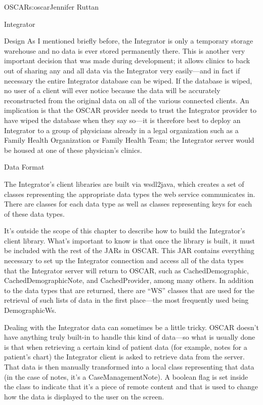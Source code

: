 \begin{aosachapter}{OSCAR}{s:oscar}{Jennifer Ruttan}
\begin{aosasect1}{Integrator}
\begin{aosasect2}{Design}
As I mentioned briefly before, the Integrator is only a temporary
storage warehouse and no data is ever stored permanently there. This
is another very important decision that was made during development;
it allows clinics to back out of sharing any and all data via the
Integrator very easily---and in fact if necessary the entire
Integrator database can be wiped. If the database is wiped, no user of
a client will ever notice because the data will be accurately
reconstructed from the original data on all of the various connected
clients. An implication is that the OSCAR provider needs to trust the
Integrator provider to have wiped the database when they say so---it
is therefore best to deploy an Integrator to a group of physicians
already in a legal organization such as a Family Health Organization
or Family Health Team; the Integrator server would be housed at one of
these physician's clinics.

\end{aosasect2}

\begin{aosasect2}{Data Format}

The Integrator's client libraries are built via wsdl2java, which
creates a set of classes representing the appropriate data types the
web service communicates in. There are classes for each data type as
well as classes representing keys for each of these data types.

It's outside the scope of this chapter to describe how to build the
Integrator's client library. What's important to know is that once the
library is built, it must be included with the rest of the JARs in
OSCAR. This JAR contains everything necessary to set up the Integrator
connection and access all of the data types that the Integrator server
will return to OSCAR, such as CachedDemographic,
CachedDemographicNote, and CachedProvider, among many others. In
addition to the data types that are returned, there are ``WS'' classes
that are used for the retrieval of such lists of data in the first
place---the most frequently used being DemographicWs.

Dealing with the Integrator data can sometimes be a little
tricky. OSCAR doesn't have anything truly built-in to handle this kind
of data---so what is usually done is that when retrieving a certain
kind of patient data (for example, notes for a patient's chart) the
Integrator client is asked to retrieve data from the server. That data
is then manually transformed into a local class representing that data
(in the case of notes, it's a CaseManagementNote). A boolean flag is
set inside the class to indicate that it's a piece of remote content
and that is used to change how the data is displayed to the user on
the screen.


\end{aosasect2}
\end{aosasect1}
\end{aosachapter}
